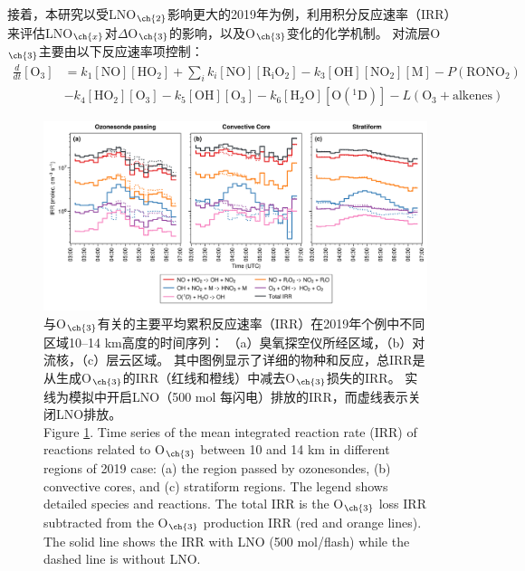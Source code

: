 接着，本研究以受LNO$_{\ch{2}}$影响更大的2019年为例，利用积分反应速率（IRR）来评估LNO$_{\ch{x}}$对$\Delta$O$_{\ch{3}}$的影响，以及O$_{\ch{3}}$变化的化学机制。
对流层O$_{\ch{3}}$主要由以下反应速率项控制\citep{Mazzuca.2016}：
{
\abovedisplayskip=3pt%
\belowdisplayskip=3pt%
\begingroup
\allowdisplaybreaks
\begin{align}
  \frac{d}{dt}[\mathrm{O_3}] &= k_1[\mathrm{NO}][\mathrm{HO_2}] + \sum_{i}  k_i[\mathrm{NO}][\mathrm{R_iO_2}] - k_3[\mathrm{OH}][\mathrm{NO_2}][\mathrm{M}] - P(\mathrm{RONO_2}) \nonumber \\
                             & - k_4[\mathrm{HO_2}][\mathrm{O_3}] - k_5[\mathrm{OH}][\mathrm{O_3}] - k_6[\mathrm{H_2O}][\mathrm{O(^1D)}] - L(\mathrm{O_3+alkenes})
\end{align}
\endgroup
}


\begin{figure}[H]
\centering
\includegraphics[width=\textwidth]{./figures/irr_timeseries.png}
\caption{
与O$_{\ch{3}}$有关的主要平均累积反应速率（IRR）在2019年个例中不同区域10--14 km高度的时间序列：
（a）臭氧探空仪所经区域，（b）对流核，（c）层云区域。
其中图例显示了详细的物种和反应，总IRR是从生成O$_{\ch{3}}$的IRR（红线和橙线）中减去O$_{\ch{3}}$损失的IRR。
实线为模拟中开启LNO（500 mol 每闪电）排放的IRR，而虚线表示关闭LNO排放。\\
Figure \ref{fig:irr_timeseries}. Time series of the mean integrated reaction rate (IRR) of reactions related to O$_{\ch{3}}$ between 10 and 14 km in different regions of 2019 case: (a) the region passed by ozonesondes, (b) convective cores, and (c) stratiform regions.
The legend shows detailed species and reactions.
The total IRR is the O$_{\ch{3}}$ loss IRR subtracted from the O$_{\ch{3}}$ production IRR (red and orange lines).
The solid line shows the IRR with LNO (500 mol/flash) while the dashed line is without LNO.
}
\label{fig:irr_timeseries}
\end{figure}


